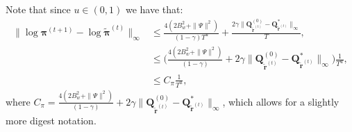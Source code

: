 Note that since $u\in(0,1)$ we have that:
\begin{align*}
    \| \log \bm{\pi}^{(t+1)} - \log \tilde{\bm{\pi}}^{(t)} \|_\infty 
    &\leq
    \frac{4(2 B_w^2+\|\Psi\|^2)}{(1 - \gamma)T^u} +
    \frac{2 \gamma 
    \|\bm{Q}^{(0)}_{\tilde{\bm{r}}^{(t)}}
    - \bm{Q}^*_{\tilde{\bm{r}}^{(t)}} \|_\infty
    }{T},\\
    &\leq
    \Bigg(
    \frac{4(2 B_w^2+\|\Psi\|^2)}{(1 - \gamma)} + 2 \gamma 
    \|\bm{Q}^{(0)}_{\tilde{\bm{r}}^{(t)}}
    - \bm{Q}^*_{\tilde{\bm{r}}^{(t)}} \|_\infty
    \Bigg)
    \frac{1}{T^u},\\
    &\leq
    C_\pi
    \frac{1}{T^u},
\end{align*}
where $C_\pi=\frac{4(2 B_w^2+\|\Psi\|^2)}{(1 - \gamma)} + 2 \gamma \|\bm{Q}^{(0)}_{\tilde{\bm{r}}^{(t)}}
- \bm{Q}^*_{\tilde{\bm{r}}^{(t)}} \|_\infty$, which allows for a slightly more digest notation.
